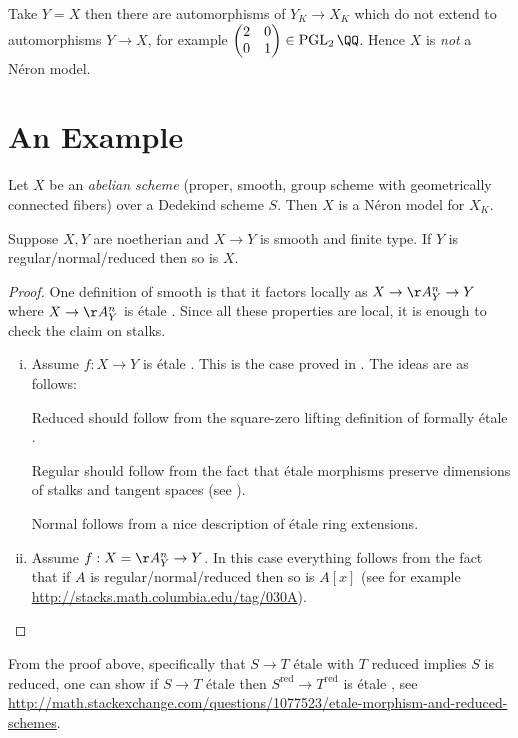 \documentclass[11pt]{article}
\newcommand{\neron}{N\'{e}ron }
\newcommand{\etale}{\'{e}tale }
\begin{document}
Take $Y = X$ then there are automorphisms of $Y_K \to X_K$ which do not extend to automorphisms $Y \to X$, for example $\begin{pmatrix}2 & 0 \\ 0 & 1\end{pmatrix} \in \operatorname{PGL}_2\QQ$. Hence $X$ is \emph{not} a \neron model.

\section{An Example}

\begin{prop}\label{asareneronmodel}
	Let $X$ be an \emph{abelian scheme} (proper, smooth, group scheme with geometrically connected fibers) over a Dedekind scheme $S$. Then $X$ is a \neron model for $X_K$.
\end{prop}

\begin{lem}\label{smoothoverregnormred}
	Suppose $X,Y$ are noetherian and $X \to Y$ is smooth and finite type. If $Y$ is regular/normal/reduced then so is $X$.
\end{lem}
\begin{proof}
	One definition of smooth is that it factors locally as $X \to \AA^n_Y \to Y$ where $X \to \AA^n_Y$ is \etale. Since all these properties are local, it is enough to check the claim on stalks.
	\begin{enumerate}[(i)]
		\item Assume $f:X\to Y$ is \etale. This is the case proved in \cite{milneLEC}. The ideas are as follows:
		
		Reduced should follow from the square-zero lifting definition of formally \etale.
		
		Regular should follow from the fact that \etale morphisms preserve dimensions of stalks and tangent spaces (see \cite[4.3.23]{liu2006algebraic}).
		
		Normal follows from a nice description of \etale ring extensions.
		
		\item Assume $f: X = \AA^n_Y \to Y$. In this case everything follows from the fact that if $A$ is regular/normal/reduced then so is $A[x]$ (see for example \url{http://stacks.math.columbia.edu/tag/030A}).
	\end{enumerate}
\end{proof}

\begin{rem}
	From the proof above, specifically that $S \to T$ \etale with $T$ reduced implies $S$ is reduced, one can show if $S \to T$ \etale then $S^{\text{red}} \to T^{\text{red}}$ is \etale, see \url{http://math.stackexchange.com/questions/1077523/etale-morphism-and-reduced-schemes}.
\end{rem}
\end{document}
